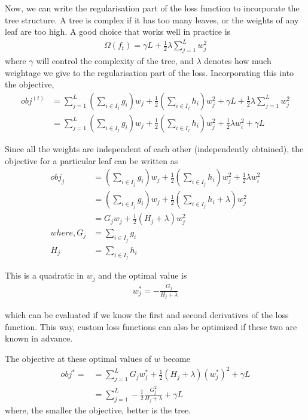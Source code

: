 \documentclass[../statistical_learning_notes.tex]{subfiles}
\begin{document}
Now, we can write the regularisation part of the loss function to incorporate the tree structure. A tree is complex if it has too many leaves, or the weights of any leaf are too high. A good choice that works well in practice is
\begin{align*}
    \Omega(f_{t}) = \gamma L + \frac{1}{2}\lambda \sum_{j=1}^{L} w_{j}^{2}
\end{align*}
where $\gamma$ will control the complexity of the tree, and $\lambda$ denotes how much weightage we give to the regularisation part of the loss. Incorporating this into the objective,
\begin{align*}
    obj^{(t)} &= \sum_{j=1}^{L} (\sum_{i \in I_{j}} g_{i})w_{j} + \frac{1}{2}(\sum_{i \in I_{j}} h_{i})w^{2}_{j} + \gamma L + \frac{1}{2}\lambda \sum_{j=1}^{L} w_{j}^{2}\\
    &= \sum_{j=1}^{L} (\sum_{i \in I_{j}} g_{i})w_{j} + \frac{1}{2}(\sum_{i \in I_{j}} h_{i})w^{2}_{j} + \frac{1}{2}\lambda w_{i}^{2} + \gamma L
\end{align*}

Since all the weights are independent of each other (independently obtained), the objective for a particular leaf can be written as
\begin{align*}
    obj_{j} &= (\sum_{i \in I_{j}} g_{i})w_{j} + \frac{1}{2}(\sum_{i \in I_{j}} h_{i})w^{2}_{j} + \frac{1}{2}\lambda w_{i}^{2}\\
    &= (\sum_{i \in I_{j}} g_{i})w_{j} + \frac{1}{2}(\sum_{i \in I_{j}} h_{i} + \lambda)w^{2}_{j}\\
    &= G_{j} w_{j} + \frac{1}{2} (H_{j} + \lambda)w_{j}^{2}\\
    where, G_{j} &= \sum_{i \in I_{j}} g_{i}\\
    H_{j} &= \sum_{i \in I_{j}} h_{i}
\end{align*}

This is a quadratic in $w_{j}$ and the optimal value is
\begin{align*}
    w^{\ast}_{j} = -\frac{G_{j}}{H_{j} + \lambda}
\end{align*}

which can be evaluated if we know the first and second derivatives of the loss function. This way, custom loss functions can also be optimized if these two are known in advance.\newline

The objective at these optimal values of $w$ become
\begin{align*}
    obj^{\ast} = &= \sum_{j=1}^{L} G_{j}w^{\ast}_{j} + \frac{1}{2}(H_{j}+\lambda)(w^{\ast}_{j})^{2} + \gamma L\\
    &= \sum_{j=1}^{L} -\frac{1}{2}\frac{G^{2}_{j}}{H_{j} + \lambda} + \gamma L
\end{align*}
where, the smaller the objective, better is the tree.\newline   
\end{document}
